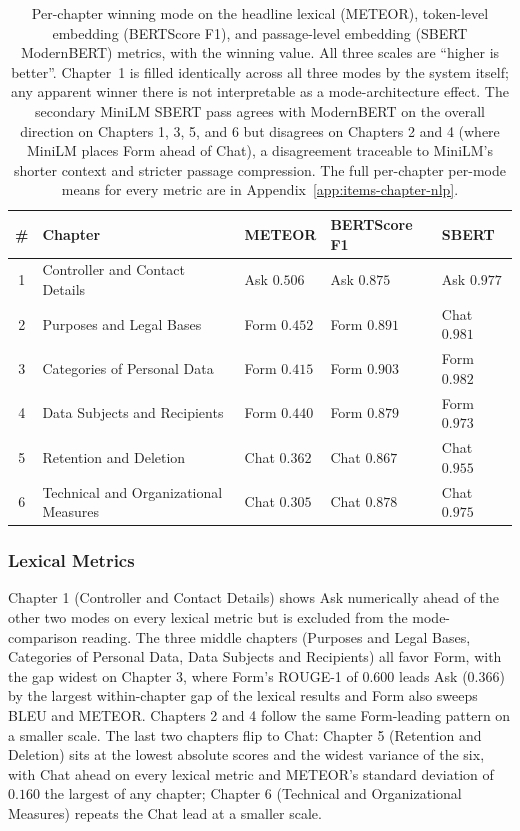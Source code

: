 \begin{table}[htbp]
\centering
\caption{Per-chapter winning mode on the headline lexical (METEOR),
token-level embedding (BERTScore F1), and passage-level embedding
(SBERT ModernBERT) metrics, with the winning value. All three
scales are ``higher is better''. Chapter~1 is filled identically
across all three modes by the system itself; any apparent winner
there is not interpretable as a mode-architecture effect. The
secondary MiniLM SBERT pass agrees with ModernBERT on the
overall direction on Chapters 1, 3, 5, and 6 but disagrees on
Chapters 2 and 4 (where MiniLM places Form ahead of Chat), a
disagreement traceable to MiniLM's shorter context and stricter
passage compression. The full per-chapter per-mode means for every
metric are in Appendix~\ref{app:items-chapter-nlp}.}
\label{tab:nlp-chapter-winners}
\begin{tabularx}{\linewidth}{@{}c X l l l@{}}
\toprule
\# & Chapter & METEOR & BERTScore F1 & SBERT \\
\midrule
1 & Controller and Contact Details              & Ask\hphantom{m}  $0.506$ & Ask\hphantom{m}  $0.875$ & Ask\hphantom{m}  $0.977$ \\
2 & Purposes and Legal Bases                    & Form $0.452$ & Form $0.891$ & Chat $0.981$ \\
3 & Categories of Personal Data                 & Form $0.415$ & Form $0.903$ & Form $0.982$ \\
4 & Data Subjects and Recipients                & Form $0.440$ & Form $0.879$ & Form $0.973$ \\
5 & Retention and Deletion                      & Chat $0.362$ & Chat $0.867$ & Chat $0.955$ \\
6 & Technical and Organizational Measures       & Chat $0.305$ & Chat $0.878$ & Chat $0.975$ \\
\bottomrule
\end{tabularx}
\end{table}

\subsubsection{Lexical Metrics}
\label{ssec:nlp-chapter-lexical}

Chapter 1 (Controller and Contact Details) shows Ask numerically
ahead of the other two modes on every lexical metric but is excluded from the mode-comparison reading.
The three middle chapters (Purposes and Legal Bases, Categories of Personal Data, Data
Subjects and Recipients) all favor Form, with the gap widest on
Chapter 3, where Form's ROUGE-1 of $0.600$ leads Ask ($0.366$) by
the largest within-chapter gap of the lexical results and Form
also sweeps BLEU and METEOR. Chapters 2 and 4 follow the same
Form-leading pattern on a smaller scale. The last two chapters
flip to Chat: Chapter 5 (Retention and Deletion) sits at the
lowest absolute scores and the widest variance of the six, with
Chat ahead on every lexical metric and METEOR's standard
deviation of $0.160$ the largest of any chapter; Chapter 6
(Technical and Organizational Measures) repeats the Chat lead at
a smaller scale.

